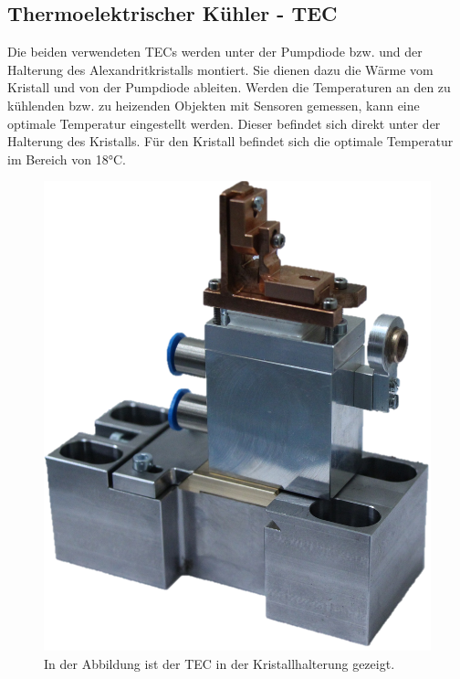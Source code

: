 \subsection{Thermoelektrischer Kühler - TEC}
Die beiden verwendeten TECs werden unter der Pumpdiode bzw. und der Halterung des Alexandritkristalls montiert. Sie dienen dazu die Wärme vom Kristall und von der Pumpdiode ableiten. Werden die Temperaturen an den zu kühlenden bzw. zu heizenden Objekten mit Sensoren gemessen, kann eine optimale Temperatur eingestellt werden. Dieser befindet sich direkt unter der Halterung des Kristalls. Für den Kristall befindet sich die optimale Temperatur im Bereich von 18°C.


\begin{figure}
    \centering
    \includegraphics[scale=0.3]{98_images/real_front_02.PNG}
    \caption{In der Abbildung ist der TEC in der Kristallhalterung gezeigt.}
    \label{fig:tec_cr_hw}
\end{figure}

